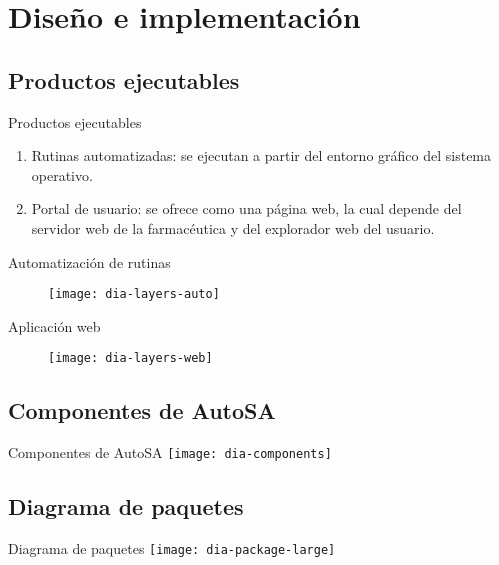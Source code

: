 \section{Diseño e implementación}
\subsection{Productos ejecutables}
	\begin{frame}{Productos ejecutables}
		\begin{enumerate}
		 	\item Rutinas automatizadas: se ejecutan a partir del entorno gráfico del sistema operativo.
		 	\item Portal de usuario: se ofrece como una página web, la cual depende del servidor web de la farmacéutica y del explorador web del usuario.
		\end{enumerate}
	\end{frame}
	\begin{frame}{Automatización de rutinas}
		\begin{figure}[h]
		\centering
		\texttt{[image: dia-layers-auto]}
		\label{fig:dia-layers-auto}
		\end{figure}
	\end{frame}
	\begin{frame}{Aplicación web}
		\begin{figure}[h]
		\centering
		\texttt{[image: dia-layers-web]}
		\label{fig:dia-layers-web}
		\end{figure}
	\end{frame}

\subsection{Componentes de AutoSA}
	\begin{frame}{Componentes de AutoSA}
		\centering
		\texttt{[image: dia-components]}
	\end{frame}

\subsection{Diagrama de paquetes}
	\begin{frame}{Diagrama de paquetes}
		\centering
		\texttt{[image: dia-package-large]}
	\end{frame}
